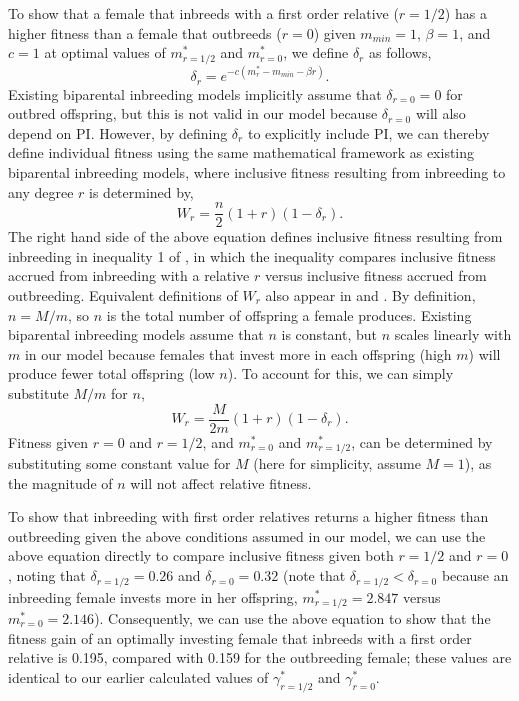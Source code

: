 \documentclass[12pt]{article}
\begin{document}
To show that a female that inbreeds with a first order relative ($r=1/2$) has a higher fitness than a female that outbreeds ($r=0$) given $m_{min}=1$, $\beta=1$, and $c=1$ at optimal values of $m^{*}_{r=1/2}$ and $m^{*}_{r=0}$, we define $\delta_{r}$ as follows,
\begin{equation}
\delta_{r} = e^{-c(m^{*}_{r}-m_{min}-\beta r)}.
\end{equation}
Existing biparental inbreeding models \cite[e.g.,][]{Kokko2006, Parker2006, Duthie2015a} implicitly assume that $\delta_{r=0}=0$ for outbred offspring, but this is not valid in our model because $\delta_{r=0}$ will also depend on PI. However, by defining $\delta_{r}$ to explicitly include PI, we can thereby define individual fitness using the same mathematical framework as existing biparental inbreeding models, where inclusive fitness resulting from inbreeding to any degree $r$ is determined by,
\begin{equation}
W_{r} = \frac{n}{2}\left(1+r\right)\left(1-\delta_{r}\right).
\end{equation}
The right hand side of the above equation defines inclusive fitness resulting from inbreeding in inequality 1 of \cite{Duthie2015a}, in which the inequality compares inclusive fitness accrued from inbreeding with a relative $r$ versus inclusive fitness accrued from outbreeding. Equivalent definitions of $W_{r}$ also appear in \cite{Parker2006} and \cite{Kokko2006}. By definition, $n = M/m$, so $n$ is the total number of offspring a female produces. Existing biparental inbreeding models assume that $n$ is constant, but $n$ scales linearly with $m$ in our model because females that invest more in each offspring (high $m$) will produce fewer total offspring (low $n$). To account for this, we can simply substitute $M/m$ for $n$,
\begin{equation}
W_{r} = \frac{M}{2 m}\left(1+r\right)\left(1-\delta_{r}\right).
\end{equation}
Fitness given $r=0$ and $r=1/2$, and $m^{*}_{r=0}$ and $m^{*}_{r=1/2}$, can be determined by substituting some constant value for $M$ (here for simplicity, assume $M=1$), as the magnitude of $n$ will not affect relative fitness. 

To show that inbreeding with first order relatives returns a higher fitness than outbreeding given the above conditions assumed in our model, we can use the above equation directly to compare inclusive fitness given both $r=1/2$ and $r=0$, noting that $\delta_{r=1/2}=0.26$ and $\delta_{r=0}=0.32$ (note that $\delta_{r=1/2}<\delta_{r=0}$ because an inbreeding female invests more in her offspring, $m^{*}_{r=1/2}=2.847$ versus $m^{*}_{r=0}=2.146$). Consequently, we can use the above equation to show that the fitness gain of an optimally investing female that inbreeds with a first order relative is 0.195, compared with 0.159 for the outbreeding female; these values are identical to our earlier calculated values of $\gamma^{*}_{r=1/2}$ and $\gamma^{*}_{r=0}$.
\end{document}
